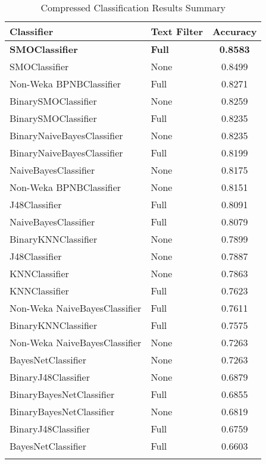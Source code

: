 \begin{center}
   \begin{longtable}{|l|l|c|}
      \hline
         Classifier & Text Filter & Accuracy
      \tabularnewline\hline
      \endhead
         \textbf{SMOClassifier} & \textbf{Full} & \textbf{0.8583}
      \tabularnewline\hline
         SMOClassifier & None & 0.8499
      \tabularnewline\hline
         Non-Weka BPNBClassifier & Full & 0.8271
      \tabularnewline\hline
         BinarySMOClassifier & None & 0.8259
      \tabularnewline\hline
         BinarySMOClassifier & Full & 0.8235
      \tabularnewline\hline
         BinaryNaiveBayesClassifier & None & 0.8235
      \tabularnewline\hline
         BinaryNaiveBayesClassifier & Full & 0.8199
      \tabularnewline\hline
         NaiveBayesClassifier & None & 0.8175
      \tabularnewline\hline
         Non-Weka BPNBClassifier & None & 0.8151
      \tabularnewline\hline
         J48Classifier & Full & 0.8091
      \tabularnewline\hline
         NaiveBayesClassifier & Full & 0.8079
      \tabularnewline\hline
         BinaryKNNClassifier & None & 0.7899
      \tabularnewline\hline
         J48Classifier & None & 0.7887
      \tabularnewline\hline
         KNNClassifier & None & 0.7863
      \tabularnewline\hline
         KNNClassifier & Full & 0.7623
      \tabularnewline\hline
         Non-Weka NaiveBayesClassifier & Full & 0.7611
      \tabularnewline\hline
         BinaryKNNClassifier & Full & 0.7575
      \tabularnewline\hline
         Non-Weka NaiveBayesClassifier & None & 0.7263
      \tabularnewline\hline
         BayesNetClassifier & None & 0.7263
      \tabularnewline\hline
         BinaryJ48Classifier & None & 0.6879
      \tabularnewline\hline
         BinaryBayesNetClassifier & Full & 0.6855
      \tabularnewline\hline
         BinaryBayesNetClassifier & None & 0.6819
      \tabularnewline\hline
         BinaryJ48Classifier & Full & 0.6759
      \tabularnewline\hline
         BayesNetClassifier & Full & 0.6603
      \tabularnewline\hline
      \caption[Compressed Classification Results Summary]{Compressed Classification Results Summary}
      \label{table:classification-summary-compressed}
   \end{longtable}
\end{center}

